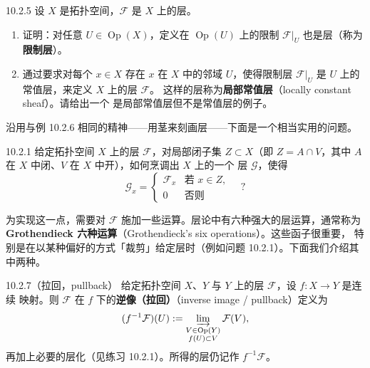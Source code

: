 \begin{wexer}{10.2.5}
  设 $X$ 是拓扑空间，$\mathcal{F}$ 是 $X$ 上的层。
  \begin{enumerate}[label=(\roman*)]
    \item 证明：对任意 $U\in\operatorname{Op}(X)$，定义在 $\operatorname{Op}(U)$ 上的限制
          $\mathcal{F}|_U$ 也是层（称为\textbf{限制层}）。
    \item 通过要求对每个 $x\in X$ 存在 $x$ 在 $X$ 中的邻域 $U$，使得限制层
          $\mathcal{F}|_U$ 是 $U$ 上的常值层，来定义 $X$ 上的层 $\mathcal{F}$。
          这样的层称为\textbf{局部常值层}（locally constant sheaf）。请给出一个
          是局部常值层但不是常值层的例子。
  \end{enumerate}
\end{wexer}

沿用与例 10.2.6 相同的精神——用茎来刻画层——下面是一个相当实用的问题。

\begin{wque}{10.2.1}
  给定拓扑空间 $X$ 上的层 $\mathcal{F}$，对局部闭子集 $Z\subset X$（即
  $Z=A\cap V$，其中 $A$ 在 $X$ 中闭、$V$ 在 $X$ 中开），如何烹调出 $X$ 上的一个
  层 $\mathcal{G}$，使得
  \[
    \mathcal{G}_x=\begin{cases}
      \mathcal{F}_x & \text{若 } x\in Z,\\
      0 & \text{否则}
    \end{cases}\quad?
  \]
\end{wque}

为实现这一点，需要对 $\mathcal{F}$ 施加一些运算。层论中有六种强大的层运算，通常称为
\textbf{Grothendieck 六种运算}（Grothendieck's six operations）。这些函子很重要，
特别是在以某种偏好的方式「裁剪」给定层时（例如问题 10.2.1）。下面我们介绍其中两种。

\begin{wdefn}{10.2.7（拉回，pullback）}
  给定拓扑空间 $X$、$Y$ 与 $Y$ 上的层 $\mathcal{F}$，设 $f\colon X\to Y$ 是连续
  映射。则 $\mathcal{F}$ 在 $f$ 下的\textbf{逆像（拉回）}（inverse image /
  pullback）定义为
  \[
    (f^{-1}\mathcal{F})(U):=\varinjlim_{\substack{V\in\operatorname{Op}(Y)\\ f(U)\subset V}}
    \mathcal{F}(V),
  \]
  再加上必要的层化（见练习 10.2.1）。所得的层仍记作 $f^{-1}\mathcal{F}$。
\end{wdefn}

